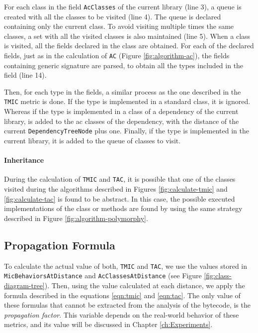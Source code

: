 For each class in the field \texttt{AcClasses} of the current library (line 3), a queue is created with all the classes to be visited (line 4). The queue is declared containing only the current class. To avoid visiting multiple times the same classes, a set with all the visited classes is also maintained (line 5). When a class is visited, all the fields declared in the class are obtained. For each of the declared fields, just as in the calculation of \texttt{AC} (Figure \ref{fig:algorithm-ac}), the fields containing generic signature are parsed, to obtain all the types included in the field (line 14).

Then, for each type in the fields, a similar process as the one described in the \texttt{TMIC} metric is done. If the type is implemented in a standard class, it is ignored. Whereas if the type is implemented in a class of a dependency of the current library, is added to the ac classes of the dependency, with the distance of the current \texttt{DependencyTreeNode} plus one. Finally, if the type is implemented in the current library, it is added to the queue of classes to visit.

\paragraph{Inheritance}
During the calculation of \texttt{TMIC} and \texttt{TAC}, it is possible that one of the classes visited during the algorithms described in Figures \ref{fig:calculate-tmic} and \ref{fig:calculate-tac} is found to be abstract. In this case, the possible executed implementations of the class or methods are found by using the same strategy described in Figure \ref{fig:algorithm-polymorphy}.

\subsection{Propagation Formula}
To calculate the actual value of both, \texttt{TMIC} and \texttt{TAC}, we use the values stored in \texttt{MicBehaviorsAtDistance} and \texttt{AcClassesAtDistance} (see Figure \ref{fig:class-diagram-tree}). Then, using the value calculated at each distance, we apply the formula described in the equations \ref{eqn:tmic} and \ref{eqn:tac}. The only value of these formulas that cannot be extracted from the analysis of the bytecode, is the \textit{propagation factor}. This variable depends on the real-world behavior of these metrics, and its value will be discussed in Chapter \ref{ch:Experiments}.

